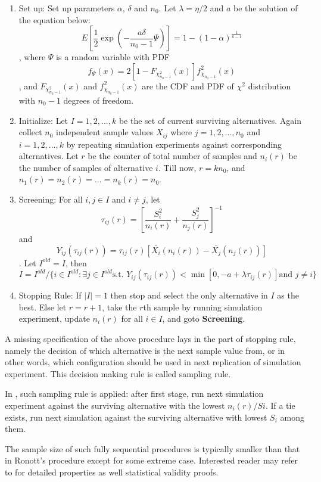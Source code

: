 \documentclass[12pt,a4]{report}
\begin{document}
\begin{enumerate}
\item{Set up: } Set up parameters $\alpha$, $\delta$ and $n_0$. Let $\lambda = \eta / 2$ and $a$ be the solution of the equation below:
$$ E[\frac{1}{2}\exp(- \frac{a\delta}{n_0 - 1} \Psi)] = 1 - (1 - \alpha)^{\frac{1}{k - 1}} $$,
where $\Psi$ is a random variable with PDF
$$ f_{\Psi}(x) = 2 [1 - F_{\chi_{n_0 - 1}^2}(x)] f_{\chi_{n_0 - 1}}^2(x) $$,
and $F_{\chi_{n_0 - 1}^2}(x)$ and $f_{\chi_{n_0 - 1}}^2(x)$ are the CDF and PDF of $\chi^2$ distribution with $n_0 - 1$ degrees of freedom.
\item{Initialize: } Let $I = {1, 2,...,k}$ be the set of current surviving alternatives. Again collect $n_0$ independent sample values $X_{ij}$ where $j = 1, 2,...,n_0$ and $i = 1, 2,...,k$ by repeating simulation experiments against corresponding alternatives. Let $r$ be the counter of total number of samples and $n_i(r)$ be the number of samples of alternative $i$. Till now, $r = kn_0$, and $n_1(r) = n_2(r) = ... = n_k(r) = n_0$.
\item{Screening: } For all $i,j \in I$ and $i \neq j$, let 
$$ \tau_{ij}(r) = [\frac{S_i^2}{n_i(r)} + \frac{S_j^2}{n_j(r)}]^{-1} $$
and
$$ Y_{ij}(\tau_{ij}(r)) = \tau_{ij}(r)[\bar{X_i}(n_i(r)) - \bar{X_j}(n_j(r))] $$.
Let $I^{old} = I$, then
$$ I = I^{old}/\{i \in I^{old}: \exists j \in I^{old} \text{s.t. } Y_{ij}(\tau_{ij}(r)) < \min[0, - a + \lambda \tau_{ij}(r)]  \text{and } j \neq i\} $$
\item{Stopping Rule: } If $|I| = 1$ then stop and select the only alternative in $I$ as the best. Else let $r = r + 1$, take the $r$th sample by running simulation experiment, update $n_i(r)$ for all $i \in I$, and goto \textbf{Screening}.
\end{enumerate}

A missing specification of the above procedure lays in the part of stopping rule, namely the decision of which alternative is the next sample value from, or in other words, which configuration should be used in next replication of simulation experiment. This decision making rule is called sampling rule.

In \cite{ras-seq-jeff}, such sampling rule is applied: after first stage, run next simulation experiment against the surviving alternative with the lowest $n_i(r)/Si$. If a tie exists, run next simulation against the surviving alternative with lowest $S_i$ among them.

The sample size of such fully sequential procedures is typically smaller than that in Ronott's procedure except for some extreme case. Interested reader may refer to \cite{ras-seq-jeff} for detailed properties as well statistical validity proofs.
\end{document}
